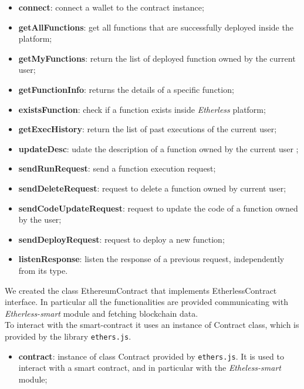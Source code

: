 					\begin{itemize}
						\item \textbf{connect}: connect a wallet to the contract instance;
						\item \textbf{getAllFunctions}: get all functions that are successfully deployed inside the platform;
						\item \textbf{getMyFunctions}: return the list of deployed function owned by the current user;
						\item \textbf{getFunctionInfo}: returns the details of a specific function;
						\item \textbf{existsFunction}: check if a function exists inside \textit{Etherless} platform;
						\item \textbf{getExecHistory}: return the list of past executions of the current user;
						\item \textbf{updateDesc}: udate the description of a function owned by the current user ;
						\item \textbf{sendRunRequest}: send a function execution request;
						\item \textbf{sendDeleteRequest}: request to delete a function owned by current user; 
						\item \textbf{sendCodeUpdateRequest}: request to update the code of a function owned by the user; 
						\item \textbf{sendDeployRequest}: request to deploy a new function; 
						\item \textbf{listenResponse}: listen the response of a previous request, independently from its type.
					\end{itemize}
		
			We created the class EthereumContract that implements EtherlessContract interface. In particular all the functionalities are provided communicating with \textit{Etherless-smart} module and fetching blockchain data. \\ To interact with the smart-contract it uses an instance of Contract class, which is provided by the library \texttt{ethers.js}.
					\begin{itemize}
						\item \textbf{contract}: instance of class Contract provided by \texttt{ethers.js}. It is used to interact with a smart contract, and in particular with the \textit{Etheless-smart} module; 
					\end{itemize}
				
